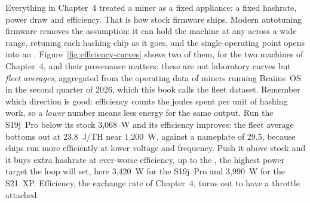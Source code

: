 Everything in Chapter~4 treated a miner as a fixed appliance: a fixed hashrate, power draw and efficiency. That is how stock firmware ships. Modern autotuning firmware removes the assumption: it can hold the machine at any  across a wide range, retuning each hashing chip as it goes, and the single operating point opens into an . Figure~\ref{fig:efficiency-curves} shows two of them, for the two machines of Chapter~4, and their provenance matters: these are not laboratory curves but \emph{fleet averages}, aggregated from the operating data of miners running Braiins~OS in the second quarter of 2026, which this book calls the fleet dataset. %
Remember which direction is good: efficiency counts the joules spent per unit of hashing work, so a \emph{lower} number means less energy for the same output. Run the S19j~Pro below its stock 3,068~W and its efficiency improves: the fleet average bottoms out at 23.8~J/TH near 1,200~W, against a nameplate of 29.5, because chips run more efficiently at lower voltage and frequency. %
Push it above stock and it buys extra hashrate at ever-worse efficiency, up to the , the highest power target the loop will set, here 3,420~W for the S19j~Pro and 3,990~W for the S21~XP. Efficiency, the exchange rate of Chapter~4, turns out to have a throttle attached. %

